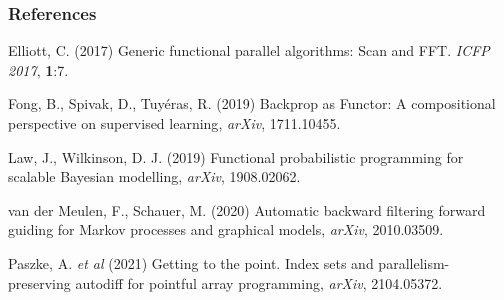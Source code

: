 \documentclass[mathserif,handout]{beamer}
\begin{document}
\begin{frame}
  \frametitle{References}

  
  \begin{thebibliography}{}
    
\bibitem{} Elliott, C. (2017) \alert{Generic functional parallel algorithms: Scan and FFT}. \emph{ICFP 2017}, \textbf{1}:7.

\bibitem{} Fong, B., Spivak, D., Tuy\'eras, R. (2019) \alert{Backprop as Functor: A compositional perspective on supervised learning}, \emph{arXiv}, 1711.10455.
   

     

      \bibitem{} Law, J., Wilkinson, D. J. (2019) \alert{Functional probabilistic programming for scalable Bayesian modelling}, \emph{arXiv}, 1908.02062.

\bibitem{} van der Meulen, F., Schauer, M. (2020) \alert{Automatic backward filtering forward guiding for Markov processes and graphical models}, \emph{arXiv}, 2010.03509.
        


\bibitem{} Paszke, A. \emph{et al} (2021) \alert{Getting to the point. Index sets and parallelism-preserving autodiff for pointful array programming}, \emph{arXiv}, 2104.05372.


\end{thebibliography}
\end{frame}
\end{document}
